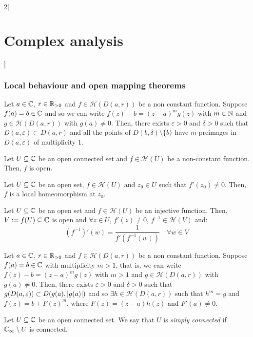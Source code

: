 \documentclass[../../../main.tex]{subfiles}
\begin{document}
\begin{multicols}{2}[\section{Complex analysis}]
  \subsubsection{Local behaviour and open mapping theorems}
  \begin{theorem}
    Let $a\in\mathbb{C}$, $r\in\mathbb{R}_{>0}$ and $f\in\mathcal{H}(D(a,r))$ be a non constant function. Suppose $f(a)=b\in \mathbb{C}$ and so we can write $f(z)-b={(z-a)}^mg(z)$ with $m\in\mathbb{N}$ and $g\in\mathcal{H}(D(a,r))$ with $g(a)\ne 0$. Then, there exists $\varepsilon>0$ and $\delta>0$ such that $D(a,\varepsilon)\subset D(a,r)$ and all the points of $D(b,\delta)\setminus\{b\}$ have $m$ preimages in $D(a,\varepsilon)$ of multiplicity 1.
  \end{theorem}
  \begin{theorem}
    Let $U\subseteq\mathbb{C}$ be an open connected set and $f\in\mathcal{H}(U)$ be a non-constant function. Then, $f$ is open.
  \end{theorem}
  \begin{corollary}
    Let $U\subseteq\mathbb{C}$ be an open set, $f\in\mathcal{H}(U)$ and $z_0\in U$ such that $f'(z_0)\ne 0$. Then, $f$ is a local homeomorphism at $z_0$.
  \end{corollary}
  \begin{corollary}
    Let $U\subseteq\mathbb{C}$ be an open set and $f\in\mathcal{H}(U)$ be an injective function. Then, $V:=f(U)\subseteq \mathbb{C}$ is open and $\forall z\in U$, $f'(z)\ne 0$, $f^{-1}\in \mathcal{H}(V)$ and: $${(f^{-1})}'(w)=\frac{1}{f'(f^{-1}(w))}\quad\forall w\in V$$
  \end{corollary}
  \begin{theorem}
    Let $a\in\mathbb{C}$, $r\in\mathbb{R}_{>0}$ and $f\in\mathcal{H}(D(a,r))$ be a non constant function. Suppose $f(a)=b\in \mathbb{C}$ with multiplicity $m>1$, that is, we can write $f(z)-b={(z-a)}^mg(z)$ with $m>1$ and $g\in\mathcal{H}(D(a,r))$ with $g(a)\ne 0$. Then, there exists $\varepsilon>0$ and $\delta>0$ such that $g(D(a,\varepsilon))\subset D(g(a),\abs{g(a)})$ and so $\exists h\in \mathcal{H}(D(a,r))$ such that $h^m=g$ and $f(z)=b+{F(z)}^m$, where $F(z)=(z-a)h(z)$ and $F'(a)\ne 0$.
  \end{theorem}
  \begin{definition}
    Let $U\subseteq\mathbb{C}$ be an open connected set. We say that $U$ is \emph{simply connected} if $\mathbb{C}_\infty\setminus U$ is connected.
  \end{definition}
  \begin{proposition}

\end{proposition}
\end{multicols}
\end{document}
